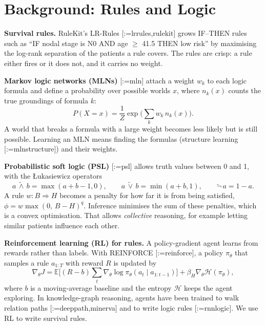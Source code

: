 \documentclass{mnnit}
\makeatletter
\newcommand{\rc}[1]{[\def\rc@sep{}\@for\rc@key:=#1\do{\rc@sep\ref{ref:\rc@key}\def\rc@sep{, }}]}
\makeatother
\begin{document}
\section{Background: Rules and Logic}
\textbf{Survival rules.} RuleKit's LR-Rules \rc{lrrules,rulekit} grows IF--THEN rules such as ``IF nodal stage is N0
AND age $\ge$ 41.5 THEN low risk'' by maximising the log-rank separation of the patients a rule covers. The rules are
crisp: a rule either fires or it does not, and it carries no weight.

\textbf{Markov logic networks (MLNs)} \rc{mln} attach a weight $w_k$ to each logic formula and define a probability over
possible worlds $x$, where $n_k(x)$ counts the true groundings of formula $k$:
\begin{equation}
  P(X=x)=\frac{1}{Z}\exp\Big(\sum_k w_k\,n_k(x)\Big).
\end{equation}
A world that breaks a formula with a large weight becomes less likely but is still possible. Learning an MLN means
finding the formulas (structure learning \rc{mlnstructure}) and their weights.

\textbf{Probabilistic soft logic (PSL)} \rc{psl} allows truth values between 0 and 1, with the \L{}ukasiewicz operators
\begin{equation}
  a\,\tilde\wedge\, b=\max(a+b-1,0),\qquad a\,\tilde\vee\, b=\min(a+b,1),\qquad \tilde\neg\, a=1-a.
\end{equation}
A rule $w: B\Rightarrow H$ becomes a penalty for how far it is from being satisfied, $\phi=w\max(0,\,B-H)^q$. Inference
minimises the sum of these penalties, which is a convex optimisation. That allows \emph{collective} reasoning, for
example letting similar patients influence each other.

\textbf{Reinforcement learning (RL) for rules.} A policy-gradient agent learns from rewards rather than labels. With
REINFORCE \rc{reinforce}, a policy $\pi_\theta$ that samples a rule $a_{1:T}$ with reward $R$ is updated by
\begin{equation}
  \nabla_\theta J=\mathbb{E}\Big[(R-b)\sum_{t}\nabla_\theta\log\pi_\theta(a_t\mid a_{1:t-1})\Big]+\beta_H\nabla_\theta\mathcal{H}(\pi_\theta),
\end{equation}
where $b$ is a moving-average baseline and the entropy $\mathcal{H}$ keeps the agent exploring. In knowledge-graph
reasoning, agents have been trained to walk relation paths \rc{deeppath,minerva} and to write logic rules \rc{rnnlogic}.
We use RL to write survival rules.

\end{document}
